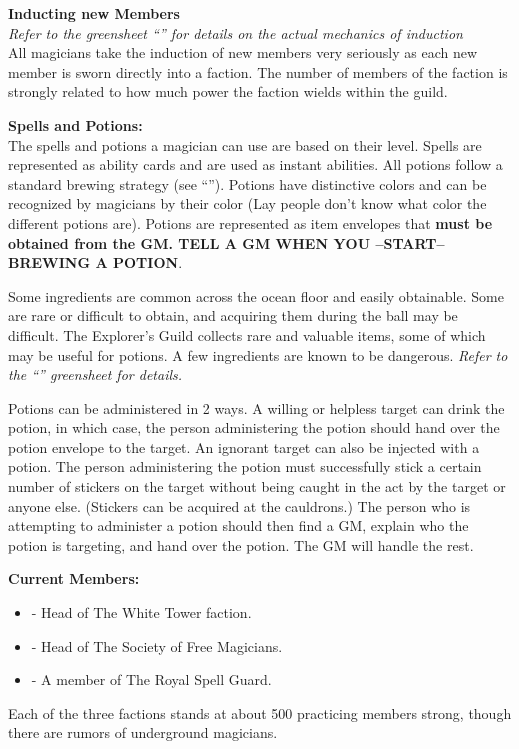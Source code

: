 \documentclass[blue]{NeptuneBall}
\begin{document}
{\bf Inducting new Members}\\
\emph{Refer to the greensheet ``\gInduction{}'' for details on the actual mechanics of induction} \\
All magicians take the induction of new members very seriously as each new member is sworn directly into a faction. The number of members of the faction is strongly related to how much power the faction wields within the guild.

{\bf Spells and Potions:}\\
The spells and potions a magician can use are based on their level. Spells are represented as ability cards and are used as instant abilities. All potions follow a standard brewing strategy (see ``\gPotions{}''). Potions have distinctive colors and can be recognized by magicians by their color (Lay people don't know what color the different potions are). Potions are represented as item envelopes that {\bf must be obtained from the GM. TELL A GM WHEN YOU --START-- BREWING A POTION}.

Some ingredients are common across the ocean floor and easily obtainable. Some are rare or difficult to obtain, and acquiring them during the ball may be difficult. The Explorer's Guild collects rare and valuable items, some of which may be useful for potions. A few ingredients are known to be dangerous. \emph {Refer to the ``\gPotions{}'' greensheet for details.}

Potions can be administered in 2 ways. A willing or helpless target can drink the potion, in which case, the person administering the potion should hand over the potion envelope to the target. An ignorant target can also be injected with a potion. The person administering the potion must successfully stick a certain number of stickers on the target without being caught in the act by the target or anyone else. (Stickers can be acquired at the cauldrons.) The person who is attempting to administer a potion should then find a GM, explain who the potion is targeting, and hand over the potion. The GM will handle the rest.

{\bf Current Members:}
\begin{itemize}
\item \cManta{} - Head of The White Tower faction.
\item \cWitch{\MYname} - Head of The Society of Free Magicians.
\item \cBodyguard{} - A member of The Royal Spell Guard.
\end{itemize}

\begin{itemz}[Trivia]
	\item Each of the three factions stands at about 500 practicing members strong, though there are rumors of underground magicians.
\end{itemz}
\end{document}
